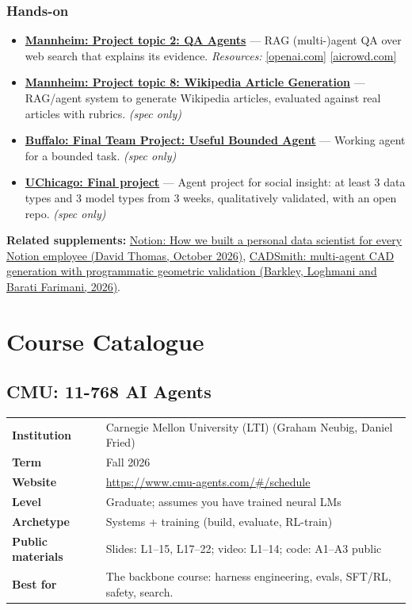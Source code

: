 \documentclass[10pt,oneside]{report}
\begin{document}
\section{Hands-on}
\begin{itemize}
\item \hyperlink{asg-MANN-7}{\textbf{Mannheim: Project topic 2: QA Agents}} --- RAG (multi-)agent QA over web search that explains its evidence. \textit{Resources:} \href{https://openai.com/index/browsecomp/}{[openai.com]} \href{https://www.aicrowd.com/challenges/meta-comprehensive-rag-benchmark-kdd-cup-2024}{[aicrowd.com]}
\item \hyperlink{asg-MANN-13}{\textbf{Mannheim: Project topic 8: Wikipedia Article Generation}} --- RAG/agent system to generate Wikipedia articles, evaluated against real articles with rubrics. \textit{(spec only)}
\item \hyperlink{asg-UB-7}{\textbf{Buffalo: Final Team Project: Useful Bounded Agent}} --- Working agent for a bounded task. \textit{(spec only)}
\item \hyperlink{asg-UCHI-10}{\textbf{UChicago: Final project}} --- Agent project for social insight: at least 3 data types and 3 model types from 3 weeks, qualitatively validated, with an open repo. \textit{(spec only)}
\end{itemize}
\textbf{Related supplements:} \hyperref[sup-notion]{Notion: How we built a personal data scientist for every Notion employee (David Thomas, October 2026)}, \hyperref[sup-cadsmith]{CADSmith: multi-agent CAD generation with programmatic geometric validation (Barkley, Loghmani and Barati Farimani, 2026)}.
\part{Course Catalogue}\hypertarget{catalog}{}
\chapter{CMU: 11-768 AI Agents}\hypertarget{course-CMU}{}
{\small\begin{tabularx}{\linewidth}{@{}>{\bfseries}l X@{}}\toprule
Institution & Carnegie Mellon University (LTI) (Graham Neubig, Daniel Fried)\\
Term & Fall 2026\\
Website & \href{https://www.cmu-agents.com/\#/schedule}{https://www.cmu-agents.com/\#/schedule}\\
Level & Graduate; assumes you have trained neural LMs\\
Archetype & Systems + training (build, evaluate, RL-train)\\
Public materials & Slides: L1--15, L17--22; video: L1--14; code: A1--A3 public\\
Best for & The backbone course: harness engineering, evals, SFT/RL, safety, search.\\
\bottomrule\end{tabularx}}
\end{document}
